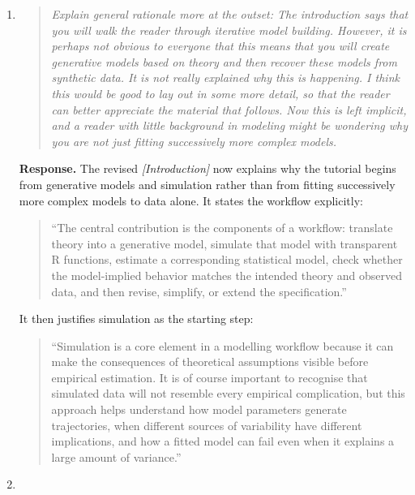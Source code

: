 \documentclass[11pt]{article}
\newcommand{\response}{\textbf{Response.} }
\newcommand{\secit}[1]{\textit{[#1]}}
\newcommand{\msq}[1]{\begin{quote}\small\noindent``#1''\end{quote}}
\newenvironment{reviewerpoint}{\begin{quote}\itshape}{\end{quote}}
\begin{document}
\begin{enumerate}[label=\textbf{Reviewer 1, Major Point \arabic*.}]

\item

\begin{reviewerpoint}
Explain general rationale more at the outset: The introduction says that you will walk the reader through iterative model building.
However, it is perhaps not obvious to everyone that this means that you will create generative models based on theory and then recover these models from synthetic data.
It is not really explained why this is happening.
I think this would be good to lay out in some more detail, so that the reader can better appreciate the material that follows.
Now this is left implicit, and a reader with little background in modeling might be wondering why you are not just fitting successively more complex models.
\end{reviewerpoint}

\response The revised \secit{Introduction} now explains why the tutorial begins from generative models and simulation rather than from fitting successively more complex models to data alone.
It states the workflow explicitly:
\msq{The central contribution is the components of a workflow: translate theory into a generative model, simulate that model with transparent R functions, estimate a corresponding statistical model, check whether the model-implied behavior matches the intended theory and observed data, and then revise, simplify, or extend the specification.}
It then justifies simulation as the starting step:
\msq{Simulation is a core element in a modelling workflow because it can make the consequences of theoretical assumptions visible before empirical estimation.
It is of course important to recognise that simulated data will not resemble every empirical complication, but this approach helps understand how model parameters generate trajectories, when different sources of variability have different implications, and how a fitted model can fail even when it explains a large amount of variance.}
\item


\end{enumerate}
\end{document}
